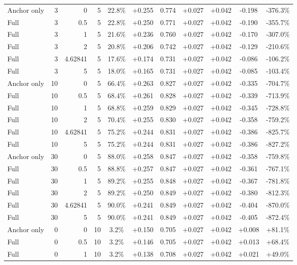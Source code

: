 \begin{table}[htbp]
\begin{tabular}{lrrrccccccc}
Anchor only & 3 & 0 & 5 & 22.8\% & +0.255 & 0.774 & +0.027 & +0.042 & -0.198 & -376.3\% \\
Full & 3 & 0.5 & 5 & 22.8\% & +0.250 & 0.771 & +0.027 & +0.042 & -0.190 & -355.7\% \\
Full & 3 & 1 & 5 & 21.6\% & +0.236 & 0.760 & +0.027 & +0.042 & -0.170 & -307.0\% \\
Full & 3 & 2 & 5 & 20.8\% & +0.206 & 0.742 & +0.027 & +0.042 & -0.129 & -210.6\% \\
Full & 3 & 4.62841 & 5 & 17.6\% & +0.174 & 0.731 & +0.027 & +0.042 & -0.086 & -106.2\% \\
Full & 3 & 5 & 5 & 18.0\% & +0.165 & 0.731 & +0.027 & +0.042 & -0.085 & -103.4\% \\
Anchor only & 10 & 0 & 5 & 66.4\% & +0.263 & 0.827 & +0.027 & +0.042 & -0.335 & -704.7\% \\
Full & 10 & 0.5 & 5 & 68.4\% & +0.261 & 0.828 & +0.027 & +0.042 & -0.339 & -713.9\% \\
Full & 10 & 1 & 5 & 68.8\% & +0.259 & 0.829 & +0.027 & +0.042 & -0.345 & -728.8\% \\
Full & 10 & 2 & 5 & 70.4\% & +0.255 & 0.830 & +0.027 & +0.042 & -0.358 & -759.2\% \\
Full & 10 & 4.62841 & 5 & 75.2\% & +0.244 & 0.831 & +0.027 & +0.042 & -0.386 & -825.7\% \\
Full & 10 & 5 & 5 & 75.2\% & +0.244 & 0.831 & +0.027 & +0.042 & -0.386 & -827.2\% \\
Anchor only & 30 & 0 & 5 & 88.0\% & +0.258 & 0.847 & +0.027 & +0.042 & -0.358 & -759.8\% \\
Full & 30 & 0.5 & 5 & 88.8\% & +0.257 & 0.847 & +0.027 & +0.042 & -0.361 & -767.1\% \\
Full & 30 & 1 & 5 & 89.2\% & +0.255 & 0.848 & +0.027 & +0.042 & -0.367 & -781.8\% \\
Full & 30 & 2 & 5 & 89.2\% & +0.250 & 0.849 & +0.027 & +0.042 & -0.380 & -812.3\% \\
Full & 30 & 4.62841 & 5 & 90.0\% & +0.241 & 0.849 & +0.027 & +0.042 & -0.404 & -870.0\% \\
Full & 30 & 5 & 5 & 90.0\% & +0.241 & 0.849 & +0.027 & +0.042 & -0.405 & -872.4\% \\
Anchor only & 0 & 0 & 10 & 3.2\% & +0.150 & 0.705 & +0.027 & +0.042 & +0.008 & +81.1\% \\
Full & 0 & 0.5 & 10 & 3.2\% & +0.146 & 0.705 & +0.027 & +0.042 & +0.013 & +68.4\% \\
Full & 0 & 1 & 10 & 3.2\% & +0.138 & 0.708 & +0.027 & +0.042 & +0.021 & +49.0\% \\

\end{tabular}
\end{table}
